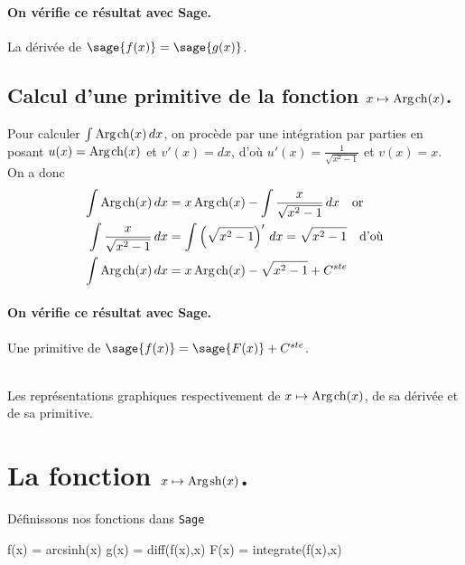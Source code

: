 \documentclass[a4paper,12pt]{report}
\renewcommand{\sinh}{\mathop{\mathrm{sh}}}
\renewcommand{\cosh}{\mathop{\mathrm{ch}}}
\renewcommand{\arg}{\mathop{\mathrm{Arg}}}
\begin{document}
\paragraph{On vérifie ce résultat avec Sage.}
La dérivée de $\sage{f(x)} = \sage{g(x)} $.


\subsection{Calcul d'une primitive de la fonction  $x \mapsto \arg\mspace{-1mu}\cosh(x)$.}
Pour calculer $\int \arg\mspace{-1mu}\cosh(x) \, dx$, on procède par une intégration par parties en posant $u(x) = \arg\mspace{-1mu}\cosh(x)$ et $v'(x) = dx$, d'où $u'(x) = \frac{1}{ \sqrt{x^2-1}}$ et $ v(x) = x $. \\
On a donc
\begin{align*}
\int \arg\mspace{-1mu}\cosh(x) \, dx & = x \arg\mspace{-1mu}\cosh(x) - \int \frac{x}{ \sqrt{x^2-1}} \, dx \quad \textrm{or}\\
\int \frac{x}{ \sqrt{x^2-1}} \, dx & = \int \left(\sqrt{x^2-1}\right)' \, dx = \sqrt{x^2-1}  \quad \textrm{d'où}\\
\int \arg\mspace{-1mu}\cosh(x) \, dx & = x \arg\mspace{-1mu}\cosh(x) - \sqrt{x^2-1} + C^{ste} 
\end{align*}


\paragraph{On vérifie ce résultat avec Sage.}
Une primitive de $\sage{f(x)} = \sage{F(x)} + C^{ste} $.

\begin{center}
\\
Les représentations graphiques respectivement de $x \mapsto \arg\mspace{-1mu}\cosh(x)$, de sa dérivée et de sa primitive.
\end{center}



\section{La fonction  $x \mapsto \arg\mspace{-1mu}\sinh(x)$.}
Définissons nos fonctions dans {\texttt{Sage}}
\begin{sageblock}
    f(x) = arcsinh(x)
    g(x) = diff(f(x),x)
    F(x) = integrate(f(x),x)
\end{sageblock}
\end{document}
